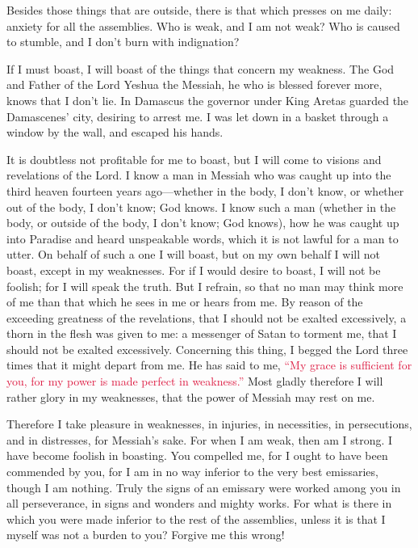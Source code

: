 \myverse{}Besides those things that are outside, there is that which presses
on me daily: anxiety for all the assemblies.
\myverse{}Who is weak, and I am not weak? Who is caused to stumble, and I don’t burn
with indignation?

\myverse{}If I must boast, I will boast of the things that concern my
weakness.
\myverse{}The God and Father of the Lord Yeshua the Messiah, he who is blessed forever
more, knows that I don’t lie.
\myverse{}In Damascus the governor under King Aretas guarded the Damascenes’ city,
desiring to arrest me.
\myverse{}I was let down in a basket through a window by the wall, and escaped his
hands.


\mychapter{} \myverse*{}It is doubtless not profitable for me to boast, but I will come
to visions and revelations of the Lord.
\myverse{}I know a man in Messiah who was caught up into the third heaven fourteen years
ago—whether in the body, I don’t know, or whether out of the body, I don’t know; God knows.
\myverse{}I know such a man (whether in the body, or outside of the body, I don’t know;
God knows),
\myverse{}how he was caught up into Paradise and heard unspeakable words, which it is
not lawful for a man to utter.
\myverse{}On behalf of such a one I will boast, but on my own behalf I will not boast,
except in my weaknesses.
\myverse{}For if I would desire to boast, I will not be foolish; for I will speak the
truth. But I refrain, so that no man may think more of me than that which he sees in me or hears from
me.
\myverse{}By reason of the exceeding greatness of the revelations, that I should not
be exalted excessively, a thorn in the flesh was given to me: a messenger of Satan to torment me, that
I should not be exalted excessively.
\myverse{}Concerning this thing, I begged the Lord three times that it might depart from
me.
\myverse{}He has said to me,
\textcolor{crimson}{“My grace is sufficient for you, for my power is made perfect in weakness.”} Most gladly therefore
I will rather glory in my weaknesses, that the power of Messiah may rest on me.

\myverse{}Therefore I take pleasure in weaknesses, in injuries, in necessities,
in persecutions, and in distresses, for Messiah’s sake. For when I am weak, then am I strong.
\myverse{}I have become foolish in boasting. You compelled me, for I ought to have
been commended by you, for I am in no way inferior to the very best emissaries, though I am nothing.
\myverse{}Truly the signs of an emissary were worked among you in all perseverance,
in signs and wonders and mighty works.
\myverse{}For what is there in which you were made inferior to the rest of the assemblies,
unless it is that I myself was not a burden to you? Forgive me this wrong!

